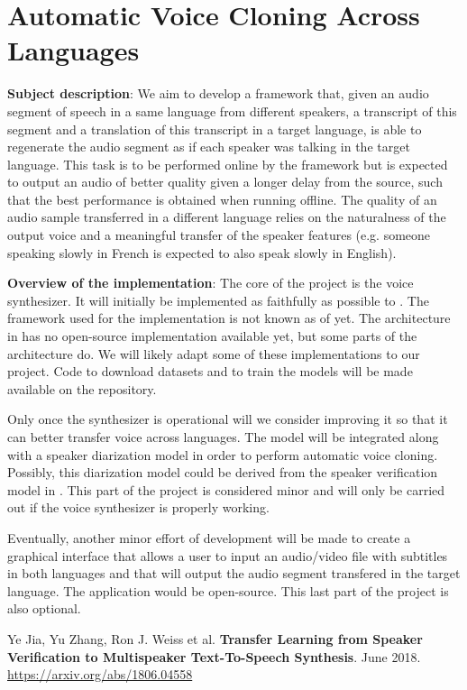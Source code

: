 \documentclass[a4paper, oneside]{article}
\begin{document}
\section*{Automatic Voice Cloning Across Languages}
\textbf{Subject description}: We aim to develop a framework that, given an audio segment of speech in a same language from different speakers, a transcript of this segment and a translation of this transcript in a target language, is able to regenerate the audio segment as if each speaker was talking in the target language. This task is to be performed online by the framework but is expected to output an audio of better quality given a longer delay from the source, such that the best performance is obtained when running offline. The quality of an audio sample transferred in a different language relies on the naturalness of the output voice and a meaningful transfer of the speaker features (e.g. someone speaking slowly in French is expected to also speak slowly in English).

\vspace{0.7cm}
\textbf{Overview of the implementation}: The core of the project is the voice synthesizer. It will initially be implemented as faithfully as possible to \cite{SV2MTTS}. The framework used for the implementation is not known as of yet. The architecture in \cite{SV2MTTS} has no open-source implementation available yet, but some parts of the architecture do. We will likely adapt some of these implementations to our project. Code to download datasets and to train the models will be made available on the repository.

Only once the synthesizer is operational will we consider improving it so that it can better transfer voice across languages. The model will be integrated along with a speaker diarization model in order to perform automatic voice cloning. Possibly, this diarization model could be derived from the speaker verification model in \cite{SV2MTTS}. This part of the project is considered minor and will only be carried out if the voice synthesizer is properly working.

Eventually, another minor effort of development will be made to create a graphical interface that allows a user to input an audio/video file with subtitles in both languages and that will output the audio segment transfered in the target language. The application would be open-source. This last part of the project is also optional.


\begin{thebibliography}{111}
	 Ye Jia, Yu Zhang, Ron J. Weiss et al. \textbf{Transfer Learning from Speaker Verification to Multispeaker Text-To-Speech Synthesis}. June 2018. \\\url{https://arxiv.org/abs/1806.04558}
\end{thebibliography}
\end{document}

